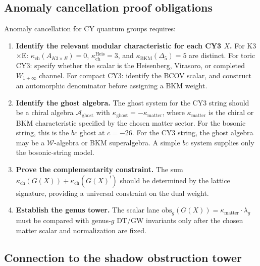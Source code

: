 \documentclass[11pt]{article}
\theoremstyle{definition}
\theoremstyle{remark}
\begin{document}
\subsection{Anomaly cancellation proof obligations}

Anomaly cancellation for CY quantum groups requires:

\begin{enumerate}[label=(\roman*)]
\item \textbf{Identify the relevant modular characteristic for each CY3 $X$.}
 For K3$\times$E:
 $\kappa_{\mathrm{ch}}(A_{K3\times E})=0$,
 $\kappa_{\mathrm{ch}}^{\mathrm{Heis}}=3$, and
 $\kappa_{\mathrm{BKM}}(\Delta_5)=5$ are distinct.
 For toric CY3: specify whether the scalar is the Heisenberg, Virasoro,
 or completed $W_{1+\infty}$ channel.
 For compact CY3: identify the BCOV scalar, and construct an
 automorphic denominator before assigning a BKM weight.

\item \textbf{Identify the ghost algebra.}
 The ghost system for the CY3 string should be a chiral algebra
 $\mathcal{A}_{\mathrm{ghost}}$ with
 $\kappa_{\mathrm{ghost}} = -\kappa_{\mathrm{matter}}$, where
 $\kappa_{\mathrm{matter}}$ is the chiral or BKM characteristic specified
 by the chosen matter sector. For the bosonic string,
 this is the $bc$ ghost at $c = -26$. For the CY3 string, the ghost
 algebra may be a $\mathcal{W}$-algebra or BKM superalgebra. A simple
 $bc$ system supplies only the bosonic-string model.

\item \textbf{Prove the complementarity constraint.}
 The sum $\kappa_{\mathrm{ch}}(G(X)) + \kappa_{\mathrm{ch}}(G(X)^!)$ should be determined by the
 lattice signature, providing a universal constraint on the dual weight.

\item \textbf{Establish the genus tower.}
 The scalar lane
 $\mathrm{obs}_g(G(X)) = \kappa_{\mathrm{matter}}\cdot\lambda_g$
 must be compared with genus-$g$ DT/GW invariants only after the chosen
 matter scalar and normalization are fixed.
\end{enumerate}

\subsection{Connection to the shadow obstruction tower}
\end{document}
